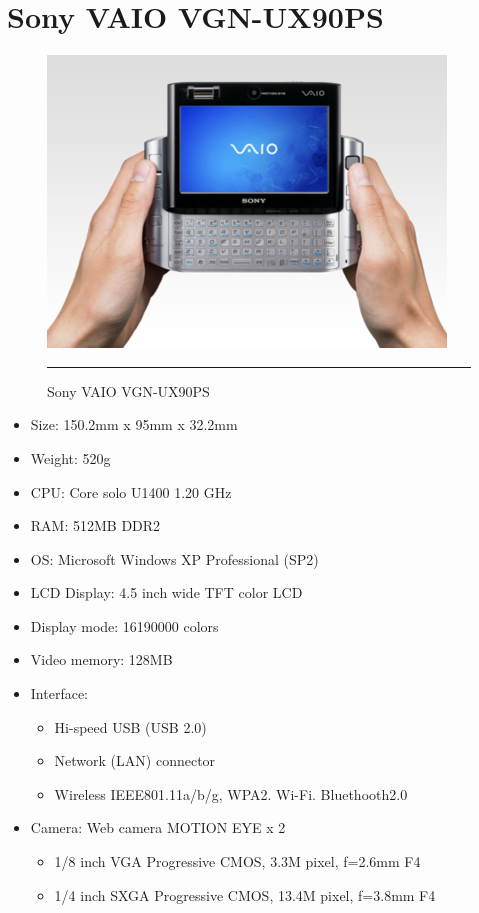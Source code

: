 \chapter{Sony VAIO VGN-UX90PS}
\label{AppendixA}

\begin{figure}[htbp]
  \centering
    \includegraphics{./Primitives/vaio.png}
    \rule{35em}{0.5pt}
  \caption[Sony VAIO VGN-UX90PS]{Sony VAIO VGN-UX90PS}
\end{figure}

\begin{itemize}
	\item Size: 150.2mm x 95mm x 32.2mm
	\item Weight: 520g
	\item CPU: Core solo U1400 1.20 GHz
	\item RAM: 512MB DDR2
	\item OS: Microsoft Windows XP Professional (SP2)
	\item LCD Display: 4.5 inch wide TFT color LCD
	\item Display mode: 16190000 colors
	\item Video memory: 128MB
	\item Interface:
		\begin{itemize}
			\item Hi-speed USB (USB 2.0)
			\item Network (LAN) connector
			\item Wireless IEEE801.11a/b/g, WPA2. Wi-Fi. Bluethooth2.0
		\end{itemize}
	\item Camera: Web camera MOTION EYE x 2
		\begin{itemize}
			\item 1/8 inch VGA Progressive CMOS, 3.3M pixel, f=2.6mm F4
			\item 1/4 inch SXGA Progressive CMOS, 13.4M pixel, f=3.8mm F4
		\end{itemize}
\end{itemize}
